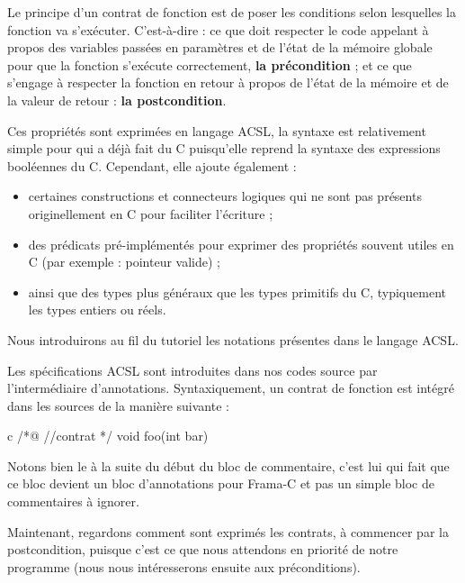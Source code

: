 Le principe d'un contrat de fonction est de poser les conditions selon 
lesquelles la fonction va s'exécuter. C'est-à-dire : ce que doit respecter 
le code appelant à propos des variables passées en paramètres et de l'état de
la mémoire globale pour que la fonction s'exécute correctement, 
\textbf{la précondition} ; et ce que s'engage à respecter la fonction en retour
à propos de l'état de la mémoire et de la valeur de retour : 
\textbf{la postcondition}.



Ces propriétés sont exprimées en langage ACSL, la syntaxe est relativement 
simple pour qui a déjà fait du C puisqu'elle reprend la syntaxe des expressions
booléennes du C. Cependant, elle ajoute également :



\begin{itemize}
\item certaines constructions et connecteurs logiques qui ne sont pas présents 
originellement en C pour faciliter l'écriture ;
\item des prédicats pré-implémentés pour exprimer des propriétés souvent utiles 
en C (par exemple : pointeur valide) ;
\item ainsi que des types plus généraux que les types primitifs du C, 
typiquement les types entiers ou réels.
\end{itemize}


Nous introduirons au fil du tutoriel les notations présentes dans le 
langage ACSL.



Les spécifications ACSL sont introduites dans nos codes source par 
l'intermédiaire d'annotations. Syntaxiquement, un contrat de fonction est 
intégré dans les sources de la manière suivante :



\begin{CodeBlock}{c}
/*@
  //contrat
*/
void foo(int bar){

}
\end{CodeBlock}



Notons bien le  à la suite du début du bloc de commentaire, c'est lui qui 
fait que ce bloc devient un bloc d'annotations pour Frama-C et pas un simple 
bloc de commentaires à ignorer.



Maintenant, regardons comment sont exprimés les contrats, à commencer par la
postcondition, puisque c'est ce que nous attendons en priorité de notre 
programme (nous nous intéresserons ensuite aux préconditions).




